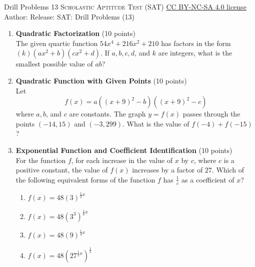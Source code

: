 \newpage\handout
{Drill Problems 13}
{\textsc{Scholastic Aptitude Test (SAT)}}
{\href{https://creativecommons.org/licenses/by-nc-sa/4.0/}{CC BY-NC-SA 4.0 license}}
{Author: \BookAuthor}{Release: \generatedOn}
{SAT: Drill Problems (13)}



\begin{enumerate}
  \item \textbf{Quadratic Factorization} (10 points)\\
  The given quartic function $54x^4 + 216x^2 + 210$ has factors in the form $(k)(a x^2 + b)(c x^2 + d)$. If $a, b, c, d$, and $k$ are integers, what is the smallest possible value of $ab$?
  \begin{subanswer}
  \end{subanswer}

  \item \textbf{Quadratic Function with Given Points} (10 points)\\
  Let
  \[
    f(x) = a\left((x+9)^2 - b\right)\left((x+9)^2 - c\right)
  \]
  where $a, b$, and $c$ are constants. The graph $y = f(x)$ passes through the 
  points $(-14, 15)$ and $(-3, 299)$. What is the value of $f(-4) + f(-15)$?
  \begin{subanswer}
  \end{subanswer}

  \item \textbf{Exponential Function and Coefficient Identification} (10 points)\\
  For the function $f$, for each increase in the value of $x$ by $c$, where $c$ is a 
  positive constant, the value of $f(x)$ increases by a factor of $27$. Which of the 
  following equivalent forms of the function $f$ has $\frac{1}{c}$ as a coefficient of $x$?
  \begin{enumerate}[label=(\Alph*)]
    \item $f(x) = 48(3)^{\frac{1}{2}x}$
    \item $f(x) = 48\left(3^3\right)^{\frac{1}{6}x}$
    \item $f(x) = 48(9)^{\frac{1}{4}x}$
    \item $f(x) = 48\left(27^{\frac{1}{3}x}\right)^{\frac{1}{2}}$
  \end{enumerate}
  \begin{subanswer}
  \end{subanswer}


\end{enumerate}
